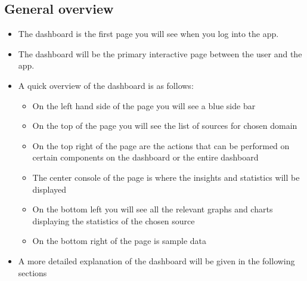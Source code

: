 \documentclass[12pt]{article}
\begin{document}
\subsection{General overview}
\begin{itemize}
    \item The dashboard is the first page you will see when you log into the app.
    \item The dashboard will be the primary interactive page between the user and the app.
    \item A quick overview of the dashboard is as follows:
    \begin{itemize}
        \item On the left hand side of the page you will see a blue side bar 
        \item On the top of the page you will see the list of sources for chosen domain
        \item On the top right of the page are the actions that can be performed on certain components on the dashboard or the entire dashboard
        \item The center console of the page is where the insights and statistics will be displayed 
        \item On the bottom left you will see all the relevant graphs and charts displaying the statistics of the chosen source 
        \item On the bottom right of the page is sample data
    \end{itemize}
    \item A more detailed explanation of the dashboard will be given in the following sections
\end{itemize}
\end{document}
